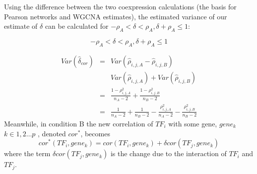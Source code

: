 \documentclass[9pt,twocolumn,twoside]{pnas-new}
\begin{document}
Using the difference between the two coexpression calculations (the basis for Pearson networks and WGCNA estimates), the estimated variance of our estimate of $\delta$ can be calculated for $-\rho_{A}<\delta<\rho_{A},\delta+\rho_{A}\le1$:
\begin{widetext}

\[
-\rho_{A}<\delta<\rho_{A},\delta+\rho_{A}\le1
\]

\begin{eqnarray*}
Var\left(\hat{\delta}_{cor}\right)&=&Var\left(\hat{\rho}_{i,j,A}-\hat{\rho}_{i,j,B}\right)\\
 &  & Var\left(\hat{\rho}_{i,j,A}\right)+Var\left(\hat{\rho}_{i,j,B}\right)\\
 & = & \frac{1-\rho_{i,j,A}^{2}}{n_{A}-2}+\frac{1-\rho_{i,j,B}^{2}}{n_{B}-2}\\
 & = & \frac{1}{n_{A}-2}+\frac{1}{n_{B}-2}-\frac{\rho_{i,j,A}^{2}}{n_{A}-2}-\frac{\rho_{i,j,B}^{2}}{n_{B}-2}
\end{eqnarray*}
Meanwhile, in condition B the new correlation of $TF_{i}$ with some
gene, $gene_{k}$ $k\in1,2\dots p$ , denoted $cor^{*}$, becomes
\[
cor^{*}\left(TF_{i},gene_{k}\right)=cor\left(TF_{i},gene_{k}\right)+\delta cor\left(TF_{j},gene_{k}\right)
\]
where the term $\delta cor\left(TF_{j},gene_{k}\right)$ is the change
due to the interaction of $TF_{i}$ and $TF_{j}$. 


\end{widetext}
\end{document}
